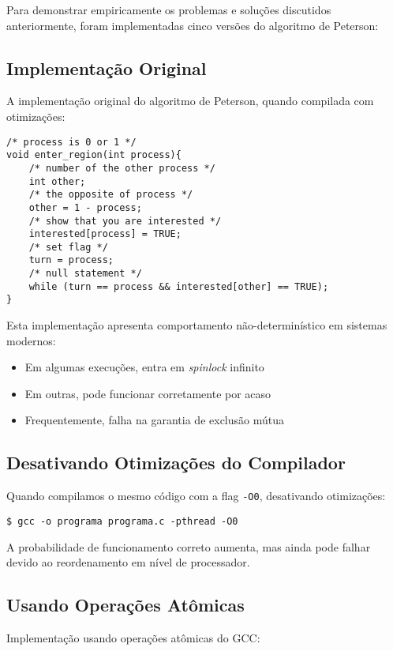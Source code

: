 \documentclass[12pt]{article}
\begin{document}
Para demonstrar empiricamente os problemas e soluções discutidos anteriormente, foram implementadas cinco versões do algoritmo de Peterson:

\subsection{Implementação Original}

A implementação original do algoritmo de Peterson, quando compilada com otimizações:

\begin{lstlisting}
/* process is 0 or 1 */
void enter_region(int process){
    /* number of the other process */
    int other;
    /* the opposite of process */
    other = 1 - process;
    /* show that you are interested */
    interested[process] = TRUE;
    /* set flag */
    turn = process;
    /* null statement */
    while (turn == process && interested[other] == TRUE);
}
\end{lstlisting}

Esta implementação apresenta comportamento não-determinístico em sistemas modernos:
\begin{itemize}
    \item Em algumas execuções, entra em \textit{spinlock} infinito
    \item Em outras, pode funcionar corretamente por acaso
    \item Frequentemente, falha na garantia de exclusão mútua
\end{itemize}

\subsection{Desativando Otimizações do Compilador}

Quando compilamos o mesmo código com a flag \texttt{-O0}, desativando otimizações:

\begin{lstlisting}
$ gcc -o programa programa.c -pthread -O0
\end{lstlisting}

A probabilidade de funcionamento correto aumenta, mas ainda pode falhar devido ao reordenamento em nível de processador.

\subsection{Usando Operações Atômicas}

Implementação usando operações atômicas do GCC:
\end{document}
